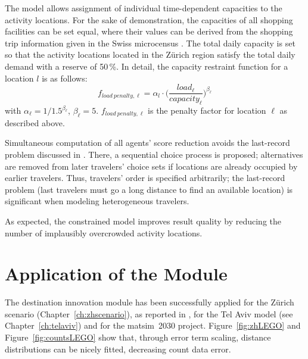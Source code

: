 The model allows assignment of individual time-dependent capacities to the activity locations. For the sake of demonstration, the capacities of all shopping facilities can be set equal, where their values can be derived from the shopping trip information given in the
Swiss microcensus \citep[][]{BfS-MZ2005_manual_2006}. 
The total daily capacity is set so that the activity locations located in the Zürich  region satisfy the total daily demand with a reserve of 50\,\%. In detail, the capacity restraint function for a location $l$ is as follows:
\[
f_{load\ penalty, \ell}=\alpha_l \cdot \Bigg(\frac{load_{\ell}}{capacity_{\ell}}\Bigg)^{\beta_\ell}
\]
with $\alpha_\ell=1/1.5^{\beta_\ell}$, $\beta_\ell=5$. $f_{load\ penalty, \ell}$ is the penalty factor for location $\ell$ as described above.

Simultaneous computation of all agents' score reduction avoids the last-record problem discussed in \citet[][]{VovshaEtAl_TRR_2002}. 
There, a sequential choice process is proposed; alternatives are removed from later travelers' choice sets if locations are already occupied by earlier travelers. 
Thus, travelers' order is specified arbitrarily; the last-record problem (last travelers must go a long distance to find an available location) is significant when modeling heterogeneous travelers. 

As expected, the constrained model improves result quality by reducing the number of implausibly overcrowded activity locations.

\section{Application of the Module}
The destination innovation module has been successfully applied for the Zürich scenario (Chapter~\ref{ch:zhscenario}), as reported in \citet[][p.99]{Horni_PhDThesis_2013}, for the Tel Aviv model (see Chapter~\ref{ch:telaviv}) and for the \gls{matsim}~2030 project. 
Figure~\ref{fig:zhLEGO} and Figure~\ref{fig:countsLEGO} show that, through error term scaling, distance distributions can be nicely fitted, decreasing count data error.

